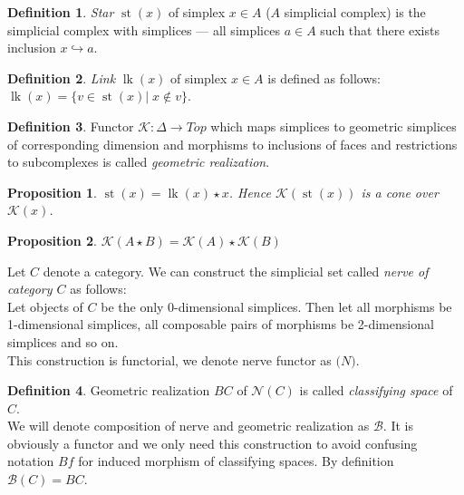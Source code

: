 \documentclass[a4paper, 12pt]{article}
\newtheorem{proposition}{Proposition}
\theoremstyle{definition}
\newtheorem{definition}{Definition}
\theoremstyle{remark}
\newcommand{\define}[1]{{\textit{#1}}}
\begin{document}
\begin{definition}
  \define{Star} $\operatorname{st}(x)$ of simplex $x \in A$ ($A$ simplicial complex) is the simplicial complex with simplices --- all simplices $a \in A$ such that there exists inclusion $x \hookrightarrow a$.
\end{definition}

\begin{definition}
  \define{Link} $\operatorname{lk}(x)$ of simplex $x \in A$ is defined as follows: $\operatorname{lk}(x) = \{v \in \operatorname{st}(x)|\; x \not\in v\}$.
\end{definition}

\begin{definition}
  Functor $\mathcal{K} : \Delta \to Top$ which maps simplices to geometric simplices of corresponding dimension and morphisms to inclusions of faces and restrictions to subcomplexes is called \define{geometric realization}.
\end{definition}

\begin{proposition}
  $\operatorname{st}(x) = \operatorname{lk}(x) \star x$. Hence $\mathcal{K}(\operatorname{st}(x))$ is a cone over $\mathcal{K}(x)$.
\end{proposition}

\begin{proposition}
  $\mathcal{K}(A \star B) = \mathcal{K}(A) \star \mathcal{K}(B)$
\end{proposition}

Let $C$ denote a category. We can construct the simplicial set called \define{nerve of category $C$} as follows:\\
Let objects of $C$ be the only 0-dimensional simplices. Then let all morphisms be 1-dimensional simplices, all composable pairs of morphisms be 2-dimensional simplices and so on.\\
This construction is functorial, we denote nerve functor as $\mathcal(N)$.

\begin{definition}
  Geometric realization $BC$ of $\mathcal{N}(C)$ is called \define{classifying space} of $C$.\\

  We will denote composition of nerve and geometric realization as $\mathcal{B}$. It is obviously a functor and we only need this construction to avoid confusing notation $Bf$ for induced morphism of classifying spaces. By definition $\mathcal{B}(C) = BC$.
\end{definition}
\end{document}
